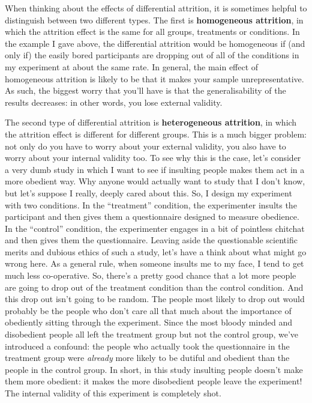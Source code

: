 \documentclass[]{book}
\begin{document}
When thinking about the effects of differential attrition, it is sometimes helpful to distinguish between two different types. The first is \textbf{homogeneous attrition}, in which the attrition effect is the same for all groups, treatments or conditions. In the example I gave above, the differential attrition would be homogeneous if (and only if) the easily bored participants are dropping out of all of the conditions in my experiment at about the same rate. In general, the main effect of homogeneous attrition is likely to be that it makes your sample unrepresentative. As such, the biggest worry that you'll have is that the generalisability of the results decreases: in other words, you lose external validity.

The second type of differential attrition is \textbf{heterogeneous attrition}, in which the attrition effect is different for different groups. This is a much bigger problem: not only do you have to worry about your external validity, you also have to worry about your internal validity too. To see why this is the case, let's consider a very dumb study in which I want to see if insulting people makes them act in a more obedient way. Why anyone would actually want to study that I don't know, but let's suppose I really, deeply cared about this. So, I design my experiment with two conditions. In the ``treatment'' condition, the experimenter insults the participant and then gives them a questionnaire designed to measure obedience. In the ``control'' condition, the experimenter engages in a bit of pointless chitchat and then gives them the questionnaire. Leaving aside the questionable scientific merits and dubious ethics of such a study, let's have a think about what might go wrong here. As a general rule, when someone insults me to my face, I tend to get much less co-operative. So, there's a pretty good chance that a lot more people are going to drop out of the treatment condition than the control condition. And this drop out isn't going to be random. The people most likely to drop out would probably be the people who don't care all that much about the importance of obediently sitting through the experiment. Since the most bloody minded and disobedient people all left the treatment group but not the control group, we've introduced a confound: the people who actually took the questionnaire in the treatment group were {\emph{already}} more likely to be dutiful and obedient than the people in the control group. In short, in this study insulting people doesn't make them more obedient: it makes the more disobedient people leave the experiment! The internal validity of this experiment is completely shot.
\end{document}
